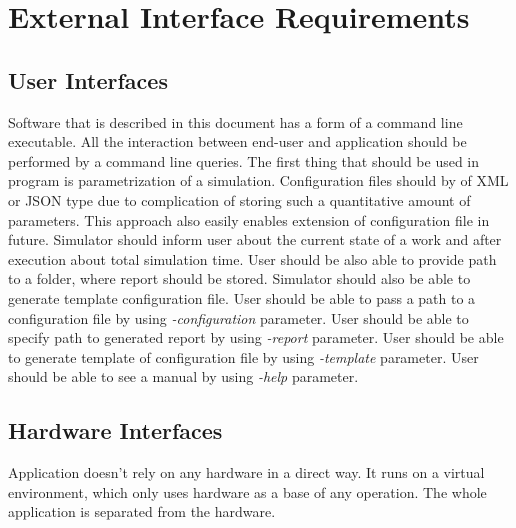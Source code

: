 
\chapter{External Interface Requirements} \label{chp:external-interface-requirements}

\section{User Interfaces}
	\begin{comment}
		$<$Describe the logical characteristics of each interface between the software 
		product and the users. This may include sample screen images, any GUI standards 
		or product family style guides that are to be followed, screen layout 
		constraints, standard buttons and functions (e.g., help) that will appear on 
		every screen, keyboard shortcuts, error message display standards, and so on.  
		Define the software components for which a user interface is needed. Details of 
		the user interface design should be documented in a separate user interface 
		specification.$>$
	\end{comment}
	Software that is described in this document has a form of a command line executable. All the interaction between end-user and application should be performed by a command line queries. The first thing that should be used in program is parametrization of a simulation. Configuration files should by of XML or JSON type due to complication of storing such a quantitative amount of parameters. This approach also easily enables extension of configuration file in future. Simulator should inform user about the current state of a work and after execution about total simulation time. User should be also able to provide path to a folder, where report should be stored. Simulator should also be able to generate template configuration file.
	{
		User should be able to pass a path to a configuration file by using \emph{-configuration} parameter.
	}
	{
		User should be able to specify path to generated report by using \emph{-report} parameter.
	}
	{
		User should be able to generate template of configuration file by using \emph{-template} parameter.
	}
	{
		User should be able to see a manual by using \emph{-help} parameter.
	}
\section{Hardware Interfaces}
	\begin{comment}
		$<$Describe the logical and physical characteristics of each interface between 
		the software product and the hardware components of the system. This may include 
		the supported device types, the nature of the data and control interactions 
		between the software and the hardware, and communication protocols to be 
		used.$>$
	\end{comment}
	Application doesn't rely on any hardware in a direct way. It runs on a virtual environment, which only uses hardware as a base of any operation. The whole application is separated from the hardware.
